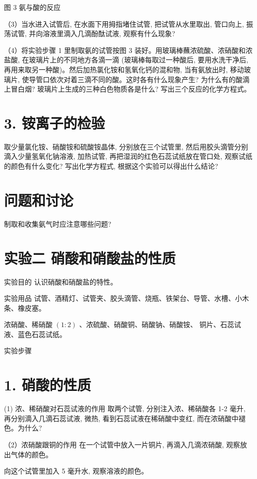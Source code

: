 \documentclass[10pt]{article}
\begin{document}
图 3 氨与酸的反应

（3）当水进入试管后, 在水面下用拇指堵住试管, 把试管从水里取出, 管口向上, 振荡试管, 并向溶液里滴入几滴酚酞试液, 观察有什么现象?

（4）将实验步骤 1 里制取氨的试管按图 3 装好。用玻璃棒蘸浓硫酸、浓硝酸和浓盐酸, 在玻璃片上的不同地方各滴一滴 (玻璃棒每取过一种酸后, 要用水洗干净后, 再用来取另一种酸)。然后加热氯化铵和氢氧化钙的混和物, 当有氨放出时, 移动玻璃片, 使导管口依次对着三滴不同的酸。这时各有什么现象产生? 为什么有的酸滴上冒白烟? 玻璃片上生成的三种白色物质各是什么? 写出三个反应的化学方程式。

\section*{3. 铵离子的检验}

取少量氯化铵、硝酸铵和硫酸铵晶体, 分别放在三个试管里, 然后用胶头滴管分别滴入少量氢氧化钠溶液, 加热试管, 再把湿润的红色石蕊试纸放在管口处, 观察试纸的颜色有什么变化? 写出化学方程式, 根据这个实验可以得出什么结论?

\section*{问题和讨论}

制取和收集氨气时应注意哪些问题?

\section*{实验二 硝酸和硝酸盐的性质}

实验目的 认识硝酸和硝酸盐的特性。

实验用品 试管、酒精灯、试管夹、胶头滴管、烧瓶、铁架台、导管、水槽、小木条、橡皮塞。

浓硝酸、稀硝酸 \(\left( {1 : 2}\right)\) 、浓硫酸、硝酸铜、硝酸钠、硝酸铵、 铜片、石蕊试液、蓝色石蕊试纸。

实验步骤

\section*{1. 硝酸的性质}

(1) 浓、稀硝酸对石蕊试液的作用 取两个试管, 分别注入浓、稀硝酸各 1-2 毫升, 再分别滴入几滴石蕊试液, 微热, 看到石蕊试液在稀硝酸中变红, 而在浓硝酸中褪色。为什么?

（2）浓硝酸跟铜的作用 在一个试管中放入一片铜片, 再滴入几滴浓硝酸, 观察放出气体的颜色。

向这个试管里加入 5 毫升水, 观察溶液的颜色。
\end{document}
